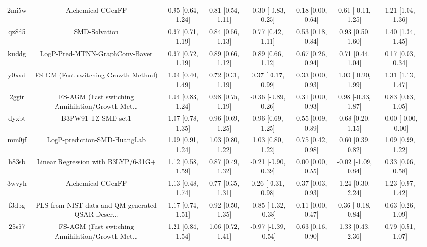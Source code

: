 \documentclass{article}
\begin{document}
\begin{center}
\begin{longtable}{|cccccccc|}
 2mi5w &                                  Alchemical-CGenFF &  0.95 [0.64, 1.24] &  0.81 [0.54, 1.11] &   -0.30 [-0.83, 0.25] &  0.18 [0.00, 0.64] &   0.61 [-0.11, 1.25] &     1.21 [1.04, 1.36] \\
 qz8d5 &                                      SMD-Solvation &  0.97 [0.71, 1.19] &  0.84 [0.56, 1.13] &     0.77 [0.42, 1.11] &  0.53 [0.18, 0.84] &    0.93 [0.50, 1.60] &     1.40 [1.34, 1.45] \\
 kuddg &                     LogP-Pred-MTNN-GraphConv-Bayer &  0.97 [0.72, 1.19] &  0.89 [0.66, 1.12] &     0.89 [0.66, 1.12] &  0.67 [0.26, 0.94] &    0.71 [0.44, 1.04] &     0.17 [0.03, 0.34] \\
 y0xxd &               FS-GM (Fast switching Growth Method) &  1.04 [0.40, 1.49] &  0.72 [0.31, 1.19] &    0.37 [-0.17, 0.99] &  0.33 [0.00, 0.93] &   1.03 [-0.20, 1.99] &     1.31 [1.13, 1.47] \\
 2ggir &  FS-AGM (Fast switching Annihilation/Growth Met... &  1.04 [0.83, 1.24] &  0.98 [0.75, 1.19] &   -0.36 [-0.89, 0.26] &  0.31 [0.00, 0.93] &   0.98 [-0.33, 1.87] &     0.83 [0.63, 1.05] \\
 dyxbt &                                 B3PW91-TZ SMD set1 &  1.07 [0.78, 1.35] &  0.96 [0.69, 1.25] &     0.96 [0.69, 1.25] &  0.55 [0.09, 0.89] &    0.68 [0.20, 1.15] &  -0.00 [-0.00, -0.00] \\
 mm0jf &                       LogP-prediction-SMD-HuangLab &  1.09 [0.91, 1.24] &  1.03 [0.80, 1.22] &     1.03 [0.80, 1.22] &  0.75 [0.42, 0.98] &    0.60 [0.39, 0.82] &     1.09 [0.99, 1.22] \\
 h83sb &                Linear Regression with B3LYP/6-31G+ &  1.12 [0.58, 1.59] &  0.87 [0.49, 1.32] &   -0.21 [-0.90, 0.39] &  0.00 [0.00, 0.55] &  -0.02 [-1.09, 0.84] &     0.33 [0.06, 0.58] \\
 3wvyh &                                  Alchemical-CGenFF &  1.13 [0.48, 1.74] &  0.77 [0.35, 1.31] &    0.26 [-0.31, 0.98] &  0.37 [0.03, 0.93] &    1.24 [0.30, 2.24] &     1.23 [0.97, 1.42] \\
 f3dpg &  PLS from NIST data and QM-generated QSAR Descr... &  1.17 [0.74, 1.51] &  0.92 [0.50, 1.35] &  -0.85 [-1.32, -0.38] &  0.11 [0.00, 0.47] &   0.36 [-0.18, 0.84] &     0.63 [0.26, 1.09] \\
 25s67 &  FS-AGM (Fast switching Annihilation/Growth Met... &  1.21 [0.84, 1.54] &  1.06 [0.72, 1.41] &  -0.97 [-1.39, -0.54] &  0.63 [0.16, 0.90] &    1.33 [0.43, 2.36] &     0.79 [0.51, 1.07] \\

\end{longtable}
\end{center}
\end{document}
